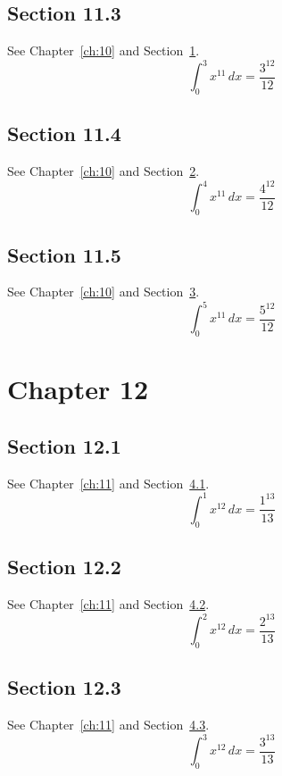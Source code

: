 \documentclass{book}
\begin{document}
\section{Section 11.3}\label{sec:11-3}
See Chapter~\ref{ch:10} and Section~\ref{sec:11-3}.
\lipsum[59-61]
\begin{equation}\label{eq:11-3} \int_0^{3} x^{11}\,dx = \frac{3^{12}}{12}\end{equation}
\section{Section 11.4}\label{sec:11-4}
See Chapter~\ref{ch:10} and Section~\ref{sec:11-4}.
\lipsum[60-62]
\begin{equation}\label{eq:11-4} \int_0^{4} x^{11}\,dx = \frac{4^{12}}{12}\end{equation}
\section{Section 11.5}\label{sec:11-5}
See Chapter~\ref{ch:10} and Section~\ref{sec:11-5}.
\lipsum[61-63]
\begin{equation}\label{eq:11-5} \int_0^{5} x^{11}\,dx = \frac{5^{12}}{12}\end{equation}
\chapter{Chapter 12}\label{ch:12}
\section{Section 12.1}\label{sec:12-1}
See Chapter~\ref{ch:11} and Section~\ref{sec:12-1}.
\lipsum[62-64]
\begin{equation}\label{eq:12-1} \int_0^{1} x^{12}\,dx = \frac{1^{13}}{13}\end{equation}
\section{Section 12.2}\label{sec:12-2}
See Chapter~\ref{ch:11} and Section~\ref{sec:12-2}.
\lipsum[63-65]
\begin{equation}\label{eq:12-2} \int_0^{2} x^{12}\,dx = \frac{2^{13}}{13}\end{equation}
\section{Section 12.3}\label{sec:12-3}
See Chapter~\ref{ch:11} and Section~\ref{sec:12-3}.
\lipsum[64-66]
\begin{equation}\label{eq:12-3} \int_0^{3} x^{12}\,dx = \frac{3^{13}}{13}\end{equation}
\end{document}
